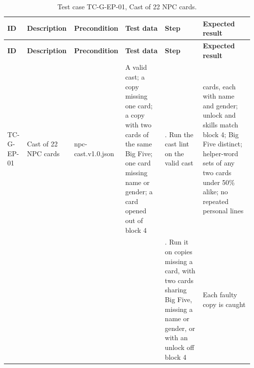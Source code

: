 {\footnotesize{}\renewcommand{\arraystretch}{1.1}
\begin{longtable}{|>{\raggedright\arraybackslash}p{}|>{\raggedright\arraybackslash}p{}|>{\raggedright\arraybackslash}p{}|>{\raggedright\arraybackslash}p{}|>{\raggedright\arraybackslash}p{}|>{\raggedright\arraybackslash}p{}|}
\caption{Test case TC-G-EP-01, Cast of 22 NPC cards.} \\
\hline
\textbf{ID} & \textbf{Description} & \textbf{Precondition} & \textbf{Test data} & \textbf{Step} & \textbf{Expected result} \\ \hline
\endfirsthead
\hline
\textbf{ID} & \textbf{Description} & \textbf{Precondition} & \textbf{Test data} & \textbf{Step} & \textbf{Expected result} \\ \hline
\endhead
TC-G-EP-01 & Cast of 22 NPC cards & npc-\allowbreak{}cast.\allowbreak{}v1.\allowbreak{}0.\allowbreak{}json & A valid cast; a copy missing one card; a copy with two cards of the same Big Five; one card missing name or gender; a card opened out of block 4 & 1. Run the cast lint on the valid cast & 22 cards, each with name and gender; unlock and skills match block 4; Big Five distinct; helper-word sets of any two cards under 50\% alike; no repeated personal lines \\ \cline{5-6}
 &  &  &  & 2. Run it on copies missing a card, with two cards sharing Big Five, missing a name or gender, or with an unlock off block 4 & Each faulty copy is caught \\ \hline
\end{longtable}
}

